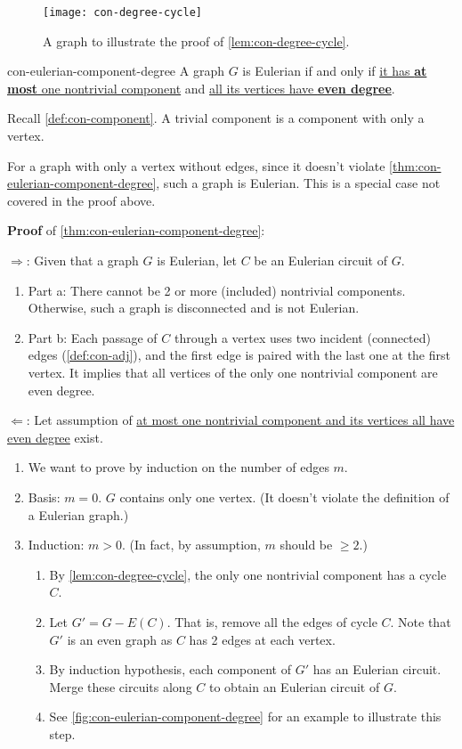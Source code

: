 \documentclass[../src/handouts/main.tex]{subfiles}
\begin{document}
\begin{figure}[htbp]
  \centering
  \texttt{[image: con-degree-cycle]}
  \caption{A graph to illustrate the proof of \cref{lem:con-degree-cycle}.}
  \label{fig:con-degree-cycle}
\end{figure}

\begin{theorem}{}{con-eulerian-component-degree}
  A graph $G$ is Eulerian if and only if \ul{it has \textbf{at most} one nontrivial component} and \ul{all its vertices have \textbf{even degree}}.
\end{theorem}

Recall \cref{def:con-component}. A trivial component is a component with only a vertex.

For a graph with only a vertex without edges, since it doesn't violate \cref{thm:con-eulerian-component-degree}, such a graph is Eulerian. This is a special case not covered in the proof above.

\textbf{Proof} of \cref{thm:con-eulerian-component-degree}:

$\Rightarrow$: Given that a graph $G$ is Eulerian, let $C$ be an Eulerian circuit of $G$.
\begin{enumerate}
  \item Part a: There cannot be 2 or more (included) nontrivial components. Otherwise, such a graph is disconnected and is not Eulerian.
  \item Part b: Each passage of $C$ through a vertex uses two incident (connected) edges (\cref{def:con-adj}), and the first edge is paired with the last one at the first vertex. It implies that all vertices of the only one nontrivial component are even degree.
\end{enumerate}

$\Leftarrow$: Let assumption of \underline{at most one nontrivial component and its vertices all have even degree} exist.
\begin{enumerate}
  \item We want to prove by induction on the number of edges $m$.
  \item Basis: $m = 0$. $G$ contains only one vertex. (It doesn't violate the definition of a Eulerian graph.)
  \item Induction: $m>0$. (In fact, by assumption, $m$ should be $\geq 2$.)
        \begin{enumerate}
          \item By \cref{lem:con-degree-cycle}, the only one nontrivial component has a cycle $C$.
          \item Let $G' = G - E(C)$. That is, remove all the edges of cycle $C$. Note that $G'$ is an even graph as $C$ has 2 edges at each vertex.
          \item By induction hypothesis, each component of $G'$ has an Eulerian circuit. Merge these circuits along $C$ to obtain an Eulerian circuit of $G$.
          \item See \cref{fig:con-eulerian-component-degree} for an example to illustrate this step.
        \end{enumerate}
\end{enumerate}
\end{document}

